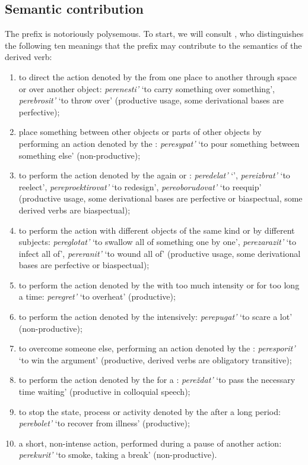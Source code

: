 \subsection{Semantic contribution}
The prefix  is notoriously polysemous. To start, we will consult \citet[pp. 363--364]{Shvedova:82}, who distinguishes the following ten meanings that the prefix may contribute to the semantics of the derived verb:
\begin{enumerate}
\item to direct the action denoted by the  from one place to another through space or over another object: \textit{perenesti'} `to carry something over something', \textit{perebrosit'} `to throw over' (productive usage, some derivational bases are perfective); 
\item place something between other objects or parts of other objects by performing an action denoted by the : \textit{peresypat'} `to pour something between something else' (non-productive); 
\item to perform the action denoted by the  again or : \textit{peredelat'} `', \textit{pereizbrat'} `to reelect', \textit{pereproektirovat'} `to redesign', \textit{pereoborudovat'} `to reequip' (productive usage, some derivational bases are perfective or biaspectual, some derived verbs are biaspectual);
\item to perform the action  with different objects of the same kind or by different subjects: \textit{pereglotat'} `to swallow all of something one by one', \textit{perezarazit'} `to infect all of', \textit{pereranit'} `to wound all of' (productive usage, some derivational bases are perfective or biaspectual);
\item to perform the action denoted by the  with too much intensity or for too long a time: \textit{peregret'} `to overheat' (productive); 
\item to perform the action denoted by the  intensively: \textit{perepugat'} `to scare a lot' (non-productive); 
\item to overcome someone else, performing an action denoted by the : \textit{peresporit'} `to win the argument' (productive, derived verbs are obligatory transitive); 
\item to perform the action denoted by the  for a : \textit{pere\v{z}dat'} `to pass the necessary time waiting' (productive in colloquial speech);
\item to stop the state, process or activity denoted by the  after a long period: \textit{perebolet'} `to recover from illness' (productive); 
\item a short, non-intense action, performed during a pause of another action: \textit{perekurit'} `to smoke, taking a break' (non-productive).
\end{enumerate} 

